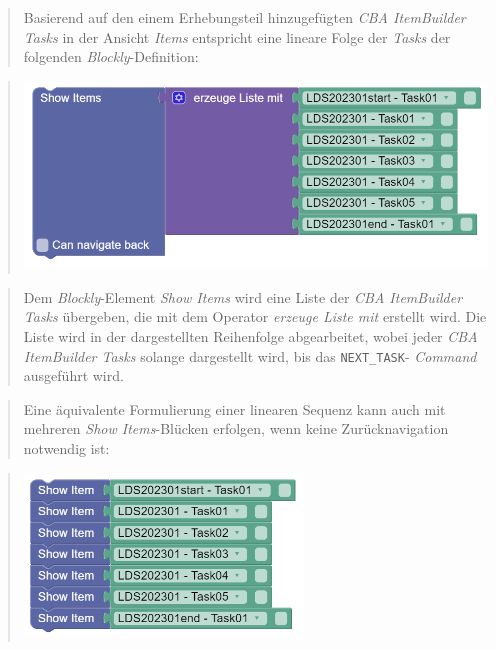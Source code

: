 \documentclass[
  letterpaper,
  DIV=11]{scrreprt}
\begin{document}
\begin{tcolorbox}
\begin{quote}
Basierend auf den einem Erhebungsteil hinzugefügten \emph{CBA
ItemBuilder Tasks} in der Ansicht \emph{Items} entspricht eine lineare
Folge der \emph{Tasks} der folgenden \emph{Blockly}-Definition:
\end{quote}

\begin{quote}
\includegraphics[width=5.20833in,height=\textheight]{img/screenshot-show-items-from-list-lds2003-01-example-DEU.png}
\end{quote}

\begin{quote}
Dem \emph{Blockly}-Element \emph{Show Items} wird eine Liste der
\emph{CBA ItemBuilder Tasks} übergeben, die mit dem Operator
\emph{erzeuge Liste mit} erstellt wird. Die Liste wird in der
dargestellten Reihenfolge abgearbeitet, wobei jeder \emph{CBA
ItemBuilder Tasks} solange dargestellt wird, bis das
\texttt{NEXT\_TASK}- \emph{Command} ausgeführt wird.
\end{quote}

\begin{quote}
Eine äquivalente Formulierung einer linearen Sequenz kann auch mit
mehreren \emph{Show Items}-Blücken erfolgen, wenn keine Zurücknavigation
notwendig ist:
\end{quote}

\begin{quote}
\includegraphics[width=2.91667in,height=\textheight]{img/screenshot-show-items-lds2003-01-example-simple-DEU.png}
\end{quote}


\end{tcolorbox}
\end{document}
